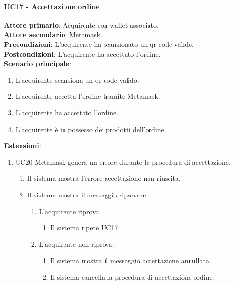 \documentclass[a4paper, 12pt]{article}
\begin{document}
\paragraph{UC17 - Accettazione ordine}
\textbf{Attore primario}: Acquirente con wallet associato.\\
\textbf{Attore secondario}: Metamask.\\
\textbf{Precondizioni}: L'acquirente ha scansionato un qr code valido.\\
\textbf{Postcondizioni}: L'acquirente ha accettato l'ordine.\\
\textbf{Scenario principale}:
\begin{enumerate}
    \item L'acquirente scansiona un qr code valido.
    \item L'acquirente accetta l'ordine tramite Metamask.
    \item L'acquirente ha accettato l'ordine.
    \item L'acquirente è in possesso dei prodotti dell'ordine.
\end{enumerate}
\textbf{Estensioni}:
\begin{enumerate}
    \item UC20 Metamask genera un errore durante la procedura di accettazione.
    \begin{enumerate}
        \item Il sistema mostra l'errore accettazione non riuscita.
        \item Il sistema mostra il messaggio riprovare.
        \begin{enumerate}
            \item L'acquirente riprova.
            \begin{enumerate}
                \item Il sistema ripete UC17.
            \end{enumerate}
            \item L'acquirente non riprova.
            \begin{enumerate}
                \item Il sistema mostra il messaggio accettazione annullata.
                \item Il sistema cancella la procedura di accettazione ordine.
            \end{enumerate}
        \end{enumerate}
    \end{enumerate}
\end{enumerate}
\end{document}
